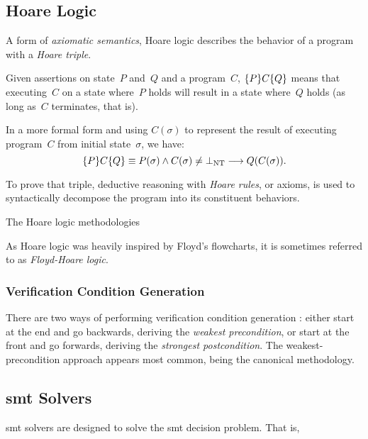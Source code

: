 \subsection{Hoare Logic}\label{se:hoare}
A form of \emph{axiomatic semantics},
Hoare logic \autocite{hoare1969axiomatic,myreen2007hoare}%
describes the behavior of a program with a \emph{Hoare triple}.
\begin{definition}
  Given assertions on state~$P$ and~$Q$ and a program~$C$,
  $\{P\}C\{Q\}$ means that executing~$C$ on a state where~$P$ holds
  will result in a state where~$Q$ holds (as long as~$C$ terminates, that is).

  In a more formal form and using $C(\sigma)$ to represent the result
  of executing program~$C$ from initial state~$\sigma$, we have:
  \begin{equation*}
    \{P\}C\{Q\}\equiv P(\sigma)\wedge C(\sigma)\neq\bot_\mathrm{NT}\longrightarrow
    Q(C(\sigma)).
  \end{equation*}
\end{definition}

To prove that triple, deductive reasoning with \emph{Hoare rules},%
or axioms, is used to syntactically decompose the program into its constituent behaviors.


The Hoare logic methodologies 

As Hoare logic was heavily inspired by Floyd's flowcharts, it is sometimes referred to
as \emph{Floyd-Hoare logic}.

\subsubsection{Verification Condition Generation}

There are two ways of performing verification condition generation%
:
either start at the end and go backwards, deriving the \emph{weakest precondition},%
or start at the front and go forwards, deriving the \emph{strongest postcondition}.%
The weakest-precondition approach appears most common,
being the canonical methodology.


\subsection{\acs*{smt} Solvers}
\Ac{smt} solvers are designed to solve the \acl{smt} decision problem.
That is, 

